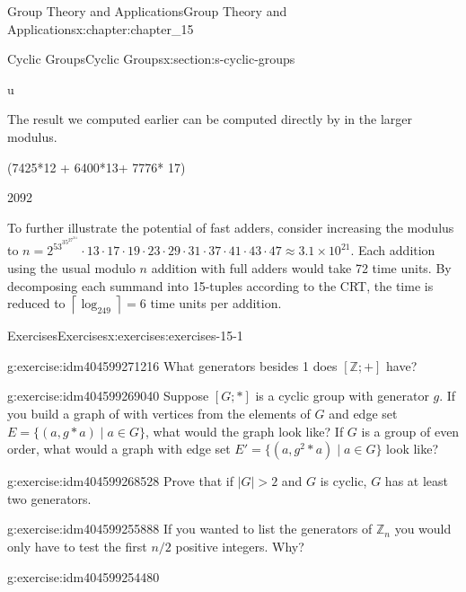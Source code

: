 \documentclass[twoside,10pt,]{book}
\numberwithin{equation}{section}
\begin{document}
\begin{chapterptx}{Group Theory and Applications}{}{Group Theory and Applications}{}{}{x:chapter:chapter_15}
\begin{sectionptx}{Cyclic Groups}{}{Cyclic Groups}{}{}{x:section:s-cyclic-groups}
\begin{sageinput}
u
\end{sageinput}
\begin{sageoutput}
[7425, 6400, 7776]
\end{sageoutput}
The result we computed earlier  can be computed  directly by in the larger modulus.%
\begin{sageinput}
(7425*12 + 6400*13+ 7776* 17)%
\end{sageinput}
\begin{sageoutput}
2092
\end{sageoutput}
To further illustrate the potential of fast adders, consider increasing the modulus to \(n=2^53^35^27^211\cdot 13\cdot 17\cdot 19\cdot 23\cdot 29\cdot 31\cdot 37\cdot 41\cdot 43\cdot 47\approx 3.1\times 10^{21}\). Each addition using the usual modulo \(n\) addition with full adders would take 72 time units. By decomposing each summand into 15-tuples according to the CRT, the time is reduced to \(\left\lceil \log _249\right\rceil =6\) time units per addition.%
%
%
\typeout{************************************************}
\typeout{************************************************}
%
\begin{exercises-subsection}{Exercises}{}{Exercises}{}{}{x:exercises:exercises-15-1}
\begin{divisionexercise}{1}{}{}{g:exercise:idm404599271216}%
What generators besides 1 does \([\mathbb{Z}; +]\) have?%
\end{divisionexercise}%
\begin{divisionexercise}{2}{}{}{g:exercise:idm404599269040}%
Suppose \([G;*]\) is a cyclic group with generator \(g\). If you build a graph of with vertices from the elements of \(G\) and edge set \(E= \{(a, g*a) \mid a\in G\}\), what would the graph look like?  If \(G\) is a group of even order, what would a graph with edge set \(E'= \{(a, g^2*a) \mid a\in G\}\) look like?%
\end{divisionexercise}%
\begin{divisionexercise}{3}{}{}{g:exercise:idm404599268528}%
Prove that if \(\lvert G \rvert >2\) and \(G\) is cyclic, \(G\) has at least two generators.%
\end{divisionexercise}%
\begin{divisionexercise}{4}{}{}{g:exercise:idm404599255888}%
If you wanted to list the generators of \(\mathbb{Z}_n\) you would only have to test the first \(n/2\) positive integers. Why?%
\end{divisionexercise}%
\begin{divisionexercise}{5}{}{}{g:exercise:idm404599254480}%

\end{divisionexercise}
\end{exercises-subsection}
\end{sectionptx}
\end{chapterptx}
\end{document}
